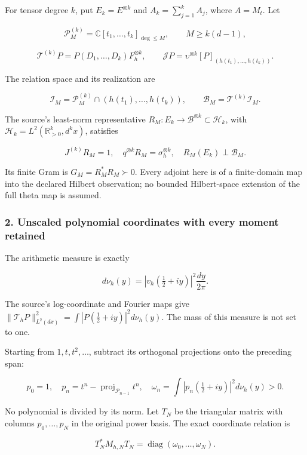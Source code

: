 For tensor degree \(k\), put \(E_k=E^{\otimes k}\) and
\(A_k=\sum_{j=1}^k A_j\), where \(A=M_t\). Let

\[\mathcal P_M^{(k)}=\mathbb C[t_1,\ldots,t_k]_{\deg\le M},\qquad M\ge k(d-1),\]

\[\mathcal T^{(k)}P=P(D_1,\ldots,D_k)F_h^{\otimes k},\qquad
\mathcal J P=\upsilon^{\otimes k}[P]_{(h(t_1),\ldots,h(t_k))}.\tag{1.4}\]

The relation space and its realization are

\[\mathcal I_M=\mathcal P_M^{(k)}\cap(h(t_1),\ldots,h(t_k)),\qquad
\mathcal B_M=\mathcal T^{(k)}\mathcal I_M.\tag{1.5}\]

The source's least-norm representative
\(R_M:E_k\to\mathscr B^{\otimes k}\subset\mathcal H_k\), with
\(\mathcal H_k=L^2(\mathbb R_{>0}^k,d^kx)\), satisfies

\[J^{(k)}R_M=1,\quad q^{\otimes k}R_M=\sigma_h^{\otimes k},\quad
R_M(E_k)\perp\mathcal B_M.\tag{1.6}\]

Its finite Gram is \(G_M=R_M^*R_M\succ0\). Every adjoint here is of a
finite-domain map into the declared Hilbert observation; no bounded
Hilbert-space extension of the full theta map is assumed.

\subsubsection{2. Unscaled polynomial coordinates with every moment
retained}\label{symmetric_frontier:unscaled-polynomial-coordinates-with-every-moment-retained}

The arithmetic measure is exactly

\[d\nu_h(y)=|v_h(\tfrac12+iy)|^2\frac{dy}{2\pi}.\tag{2.1}\]

The source's log-coordinate and Fourier maps give
\(\|\mathcal T_hP\|_{L^2(dx)}^2=\int|P(\tfrac12+iy)|^2d\nu_h(y)\). The
mass of this measure is not set to one.

Starting from \(1,t,t^2,\ldots\), subtract its orthogonal projections
onto the preceding span:

\[p_0=1,\quad p_n=t^n-\operatorname{proj}_{\mathcal P_{n-1}}t^n,\quad
\omega_n=\int|p_n(\tfrac12+iy)|^2d\nu_h(y)>0.\tag{2.2}\]

No polynomial is divided by its norm. Let \(T_N\) be the triangular
matrix with columns \(p_0,\ldots,p_N\) in the original power basis. The
exact coordinate relation is

\[T_N^*M_{h,N}T_N=\operatorname{diag}(\omega_0,\ldots,\omega_N).\tag{2.3}\]

